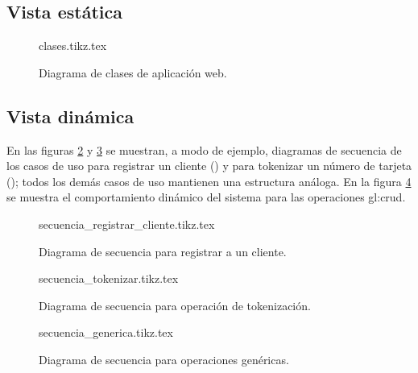\subsection{Vista estática}

\begin{figure}
  \begin{center}
    {clases.tikz.tex}
    \caption{Diagrama de clases de aplicación web.}
    \label{fig:clases_aplicacion_web}
  \end{center}
\end{figure}

\subsection{Vista dinámica}

En las figuras \ref{fig:secuencia_registrar_cliente} y
\ref{fig:secuencia_tokenizar} se muestran, a modo de ejemplo, diagramas de
secuencia de los casos de uso para registrar un cliente
() y para tokenizar un número de tarjeta
(); todos los demás casos de uso mantienen
una estructura análoga. En la figura \ref{fig:secuencia_generia} se muestra el
comportamiento dinámico del sistema para las operaciones \gls{gl:crud}.

%
%

\begin{figure}
  \begin{center}
    {secuencia_registrar_cliente.tikz.tex}
    \caption{Diagrama de secuencia para registrar a un cliente.}
    \label{fig:secuencia_registrar_cliente}
  \end{center}
\end{figure}

\begin{figure}
  \begin{center}
    {secuencia_tokenizar.tikz.tex}
    \caption{Diagrama de secuencia para operación de tokenización.}
    \label{fig:secuencia_tokenizar}
  \end{center}
\end{figure}

\begin{figure}
  \begin{center}
    {secuencia_generica.tikz.tex}
    \caption{Diagrama de secuencia para operaciones genéricas.}
    \label{fig:secuencia_generia}
  \end{center}
\end{figure}
